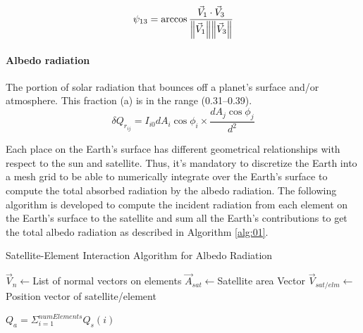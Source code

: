\documentclass[11pt]{article}
\begin{document}



\begin{equation}\label{eq:psi13}
    \psi_{13} = \arccos{\frac{\vec{V}_1\cdot \vec{V}_3}{\norm{\vec{V}_1}\norm{\vec{V}_3}}}
\end{equation}

\paragraph{Albedo radiation} 
The portion of solar radiation that bounces off a planet's surface and/or atmosphere. This fraction (a) is in the range (0.31–0.39).
\begin{equation}
    \delta Q_{r_{ij}} = I_{i0} dA_i\cos{\phi_i}\times\frac{dA_j \cos{\phi_j}}{d^2}
\end{equation}

Each place on the Earth's surface has different geometrical relationships with respect to the sun and satellite. Thus, it's mandatory to discretize the Earth into a mesh grid to be able to numerically integrate over the Earth's surface to compute the total absorbed radiation by the albedo radiation. The following algorithm is developed to compute the incident radiation from each element on the Earth's surface to the satellite and sum all the Earth's contributions to get the total albedo radiation as described in Algorithm \ref{alg:01}.




{}

\begin{algorithm}[hbt!]
\caption{Satellite-Element Interaction Algorithm for Albedo Radiation}\label{alg:two}
\label{alg:01}
$\vec{V}_{n} \gets $List of normal vectors on elements\;
$\vec{A}_{sat} \gets $Satellite area Vector\;
$\vec{V}_{sat/elm} \gets$ Position vector of satellite/element\;

        
    $Q_a = \Sigma_{i=1}^{numElements}{Q_s(i)}  $
\end{algorithm}
\end{document}
